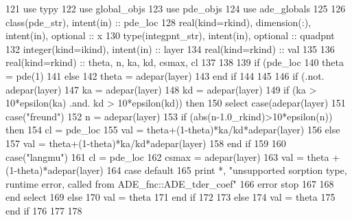 \begin{DoxyCode}
121       \textcolor{keywordtype}{use }typy
122       \textcolor{keywordtype}{use }global_objs
123       \textcolor{keywordtype}{use }pde_objs
124       \textcolor{keywordtype}{use }ade_globals
125       
126       \textcolor{keywordtype}{class}(pde_str), \textcolor{keywordtype}{intent(in)} :: pde\_loc
128       \textcolor{keywordtype}{real(kind=rkind)}, \textcolor{keywordtype}{dimension(:)}, \textcolor{keywordtype}{intent(in)}, \textcolor{keywordtype}{optional}    :: x
130       \textcolor{keywordtype}{type}(integpnt_str), \textcolor{keywordtype}{intent(in)}, \textcolor{keywordtype}{optional} :: quadpnt
132       \textcolor{keywordtype}{integer(kind=ikind)}, \textcolor{keywordtype}{intent(in)} :: layer
134       \textcolor{keywordtype}{real(kind=rkind)}                :: val
135       
136       \textcolor{keywordtype}{real(kind=rkind)} :: theta, n, ka, kd, csmax, cl
137       
138       
139       \textcolor{keywordflow}{if} (pde\_loc%
140         theta = pde(1)%
141       \textcolor{keywordflow}{else}
142         theta = adepar(layer)%
143 \textcolor{keywordflow}{      end if}
144       
145       
146       \textcolor{keywordflow}{if} (.not. adepar(layer)%
147         ka = adepar(layer)%
148         kd = adepar(layer)%
149         \textcolor{keywordflow}{if} (ka > 10*epsilon(ka) .and. kd > 10*epsilon(kd)) \textcolor{keywordflow}{then} 
150           \textcolor{keywordflow}{select case}(adepar(layer)%
151             \textcolor{keywordflow}{case}(\textcolor{stringliteral}{"freund"})
152               n = adepar(layer)%
153               \textcolor{keywordflow}{if} (abs(n-1.0\_rkind)>10*epsilon(n)) \textcolor{keywordflow}{then}
154                 cl = pde\_loc%
155                 val = theta+(1-theta)*ka/kd*adepar(layer)%
156               \textcolor{keywordflow}{else}
157                 val = theta+(1-theta)*ka/kd*adepar(layer)%
158 \textcolor{keywordflow}{              end if}
159             
160             \textcolor{keywordflow}{case}(\textcolor{stringliteral}{"langmu"})
161               cl = pde\_loc%
162               csmax = adepar(layer)%
163               val = theta + (1-theta)*adepar(layer)%
164 \textcolor{keywordflow}{            case default}
165               print *, \textcolor{stringliteral}{"unsupported sorption type, runtime error, called from ADE\_fnc::ADE\_tder\_coef"}
166               error stop
167             
168 \textcolor{keywordflow}{          end select}
169         \textcolor{keywordflow}{else}
170           val = theta
171 \textcolor{keywordflow}{        end if}
172         
173       \textcolor{keywordflow}{else}
174         val = theta
175 \textcolor{keywordflow}{      end if}
176      
177       
178     
\end{DoxyCode}


